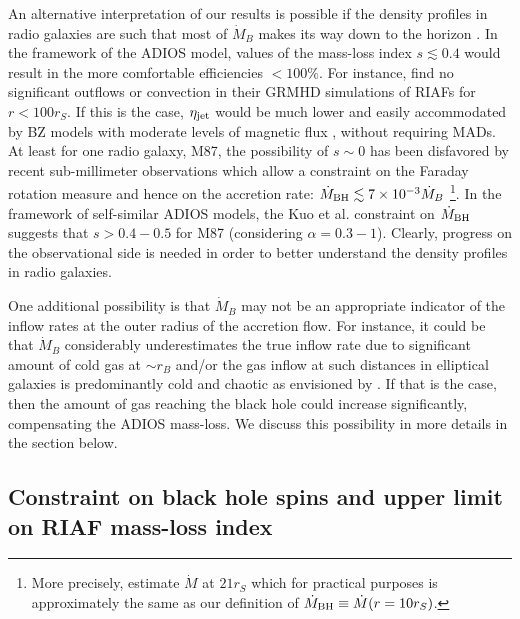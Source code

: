 \documentclass[useAMS,usenatbib]{mn2e}
\begin{document}
An alternative interpretation of our results is possible if the density profiles in radio galaxies are such that most of $\dot{M}_B$ makes its way down to the horizon \citep{Narayan11}. In the framework of the ADIOS model, values of the mass-loss index $s \lesssim 0.4$ would result in the more comfortable efficiencies $<100\%$. For instance, \cite{Narayan12grmhd} find no significant outflows or convection in their GRMHD simulations of RIAFs for $r<100 r_S$. If this is the case, $\eta_{\rm jet}$ would be much lower and easily accommodated by BZ models with moderate levels of magnetic flux \citep{Nemmen07}, without requiring MADs.  
At least for one radio galaxy, M87, the possibility of $s \sim 0$ has been disfavored by recent sub-millimeter observations which allow a constraint on the Faraday rotation measure and hence on the accretion rate: $\dot{M}_{\rm BH} \lesssim 7 \times 10^{-3} \dot{M}_B$ \citep{Kuo14}\footnote{More precisely, \cite{Kuo14} estimate $\dot{M}$ at $21 r_S$ which for practical purposes is approximately the same as our definition of $\dot{M}_{\rm BH} \equiv \dot{M}(r=10 r_S)$.}. In the framework of self-similar ADIOS models, the Kuo et al. constraint on $\dot{M}_{\rm BH}$ suggests that $s > 0.4-0.5$ for M87 (considering $\alpha=0.3-1$). Clearly, progress on the observational side is needed in order to better understand the density profiles in radio galaxies.

One additional possibility is that $\dot{M}_B$ may not be an appropriate indicator of the inflow rates at the outer radius of the accretion flow. For instance, it could be that $\dot{M}_B$  considerably underestimates the true inflow rate due to significant amount of cold gas at $\sim r_B$ and/or the gas inflow at such distances in elliptical galaxies is predominantly cold and chaotic as envisioned by \cite{Gaspari13}. If that is the case, then the amount of gas reaching the black hole could increase significantly, compensating the ADIOS mass-loss. We discuss this possibility in more details in the section below.



\subsection{Constraint on black hole spins and upper limit on RIAF mass-loss index}
\end{document}
